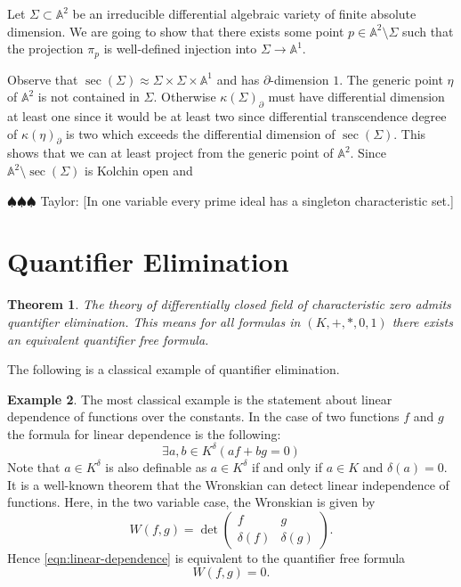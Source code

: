\documentclass[]{article}
\newcommand{\taylor}[1]{{\color{blue} \sf $\spadesuit\spadesuit\spadesuit$ Taylor: [#1]}}
\numberwithin{equation}{section}
\newtheorem{theorem}{Theorem}[subsection]
\theoremstyle{definition}
\newtheorem{example}[theorem]{Example}
\theoremstyle{remark}
\renewcommand{\AA}{\mathbb{A}}
\begin{document}
Let $\Sigma \subset \AA^2$ be an irreducible differential algebraic variety of finite absolute dimension. 
We are going to show that there exists some point $p \in \AA^2\setminus \Sigma$ such that the projection $\pi_p$ is well-defined injection into $\Sigma \to \AA^1$. 

Observe that $\sec(\Sigma) \approx \Sigma \times \Sigma \times \AA^1$ and has $\partial$-dimension $1$. 
The generic point $\eta$ of $\AA^2$ is not contained in $\Sigma$.
Otherwise $\kappa(\Sigma)_{\partial}$ must have differential dimension at least one since it would be at least two since differential transcendence degree of $\kappa(\eta)_{\partial}$ is two which exceeds the differential dimension of $\sec(\Sigma)$. 
This shows that we can at least project from the generic point of $\AA^2$.
Since $\AA^2\setminus \sec(\Sigma)$ is Kolchin open and 

\taylor{In one variable every prime ideal has a singleton characteristic set.}

\section{Quantifier Elimination}

\begin{theorem}
The theory of differentially closed field of characteristic zero admits quantifier elimination. 
This means for all formulas in $(K,+,*,0,1)$ there exists an equivalent quantifier free formula.
\end{theorem}

The following is a classical example of quantifier elimination. 
\begin{example}
The most classical example is the statement about linear dependence of functions over the constants. 
In the case of two functions $f$ and $g$ the formula for linear dependence is the following:
\begin{equation}\label{eqn:linear-dependence}
\exists a,b \in K^{\delta}(af+bg=0)
\end{equation}
Note that $a\in K^{\delta}$ is also definable as $a \in K^{\delta}$ if and only if $a\in K$ and $\delta(a)=0$. 
It is a well-known theorem that the Wronskian can detect linear independence of functions. 
Here, in the two variable case, the Wronskian is given by 
 $$ W(f,g) = \det \begin{pmatrix} f & g \\
 \delta(f) & \delta(g) 
 \end{pmatrix}.$$
Hence \eqref{eqn:linear-dependence} is equivalent to the quantifier free formula
 \begin{equation}
  W(f,g)=0.
  \end{equation}

\end{example}






%
%
\end{document}
